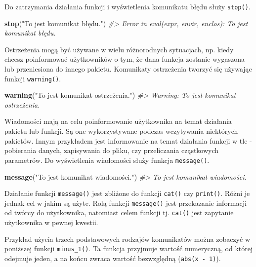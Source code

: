 \documentclass[paper=6in:9in,pagesize=pdftex,headinclude=on,footinclude=on,10pt]{scrbook}
\newenvironment{Shaded}{\begin{snugshade}}{\end{snugshade}}
\newcommand{\CommentTok}[1]{\textcolor[rgb]{0.56,0.35,0.01}{\textit{#1}}}
\newcommand{\KeywordTok}[1]{\textcolor[rgb]{0.13,0.29,0.53}{\textbf{#1}}}
\newcommand{\NormalTok}[1]{#1}
\newcommand{\StringTok}[1]{\textcolor[rgb]{0.31,0.60,0.02}{#1}}
\let\BeginKnitrBlock\begin \let\EndKnitrBlock\end
\begin{document}
Do zatrzymania działania funkcji i wyświetlenia komunikatu błędu służy \texttt{stop()}.

\begin{Shaded}
\begin{Highlighting}[]
\KeywordTok{stop}\NormalTok{(}\StringTok{"To jest komunikat błędu."}\NormalTok{)}
\CommentTok{#> Error in eval(expr, envir, enclos): To jest komunikat błędu.}
\end{Highlighting}
\end{Shaded}

Ostrzeżenia mogą być używane w wielu różnorodnych sytuacjach, np. kiedy chcesz poinformować użytkowników o tym, że dana funkcja zostanie wygaszona lub przeniesiona do innego pakietu.
Komunikaty ostrzeżenia tworzyć się używając funkcji \texttt{warning()}.

\begin{Shaded}
\begin{Highlighting}[]
\KeywordTok{warning}\NormalTok{(}\StringTok{"To jest komunikat ostrzeżenia."}\NormalTok{)}
\CommentTok{#> Warning: To jest komunikat ostrzeżenia.}
\end{Highlighting}
\end{Shaded}

Wiadomości mają na celu poinformowanie użytkownika na temat działania pakietu lub funkcji.
Są one wykorzystywane podczas wczytywania niektórych pakietów.
Innym przykładem jest informowanie na temat działania funkcji w tle - pobierania danych, zapisywania do pliku, czy przeliczania cząstkowych parametrów.
Do wyświetlenia wiadomości służy funkcja \texttt{message()}.

\begin{Shaded}
\begin{Highlighting}[]
\KeywordTok{message}\NormalTok{(}\StringTok{"To jest komunikat wiadomości."}\NormalTok{)}
\CommentTok{#> To jest komunikat wiadomości.}
\end{Highlighting}
\end{Shaded}

\BeginKnitrBlock{rmdinfo}
Działanie funkcji \texttt{message()} jest zbliżone do funkcji \texttt{cat()} czy \texttt{print()}.
Różni je jednak cel w jakim są użyte.
Rolą funkcji \texttt{message()} jest przekazanie informacji od twórcy do użytkownika, natomiast celem funkcji tj. \texttt{cat()} jest zapytanie użytkownika w pewnej kwestii.
\EndKnitrBlock{rmdinfo}

Przykład użycia trzech podstawowych rodzajów komunikatów można zobaczyć w poniższej funkcji \texttt{minus\_1()}.
Ta funkcja przyjmuje wartość numeryczną, od której odejmuje jeden, a na końcu zwraca wartość bezwzględną (\texttt{abs(x\ -\ 1)}).
\end{document}
